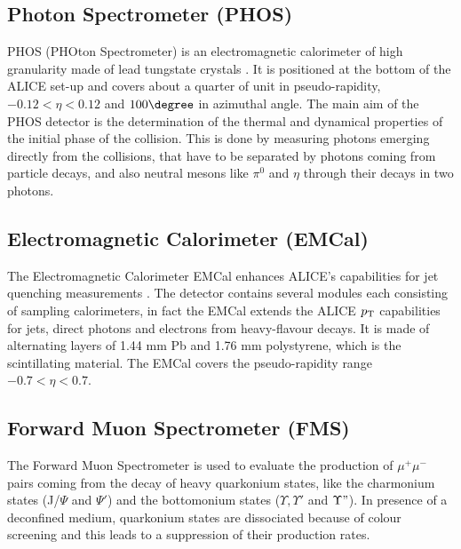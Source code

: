 \subsection{Photon Spectrometer (PHOS)}
PHOS (PHOton Spectrometer) is an electromagnetic calorimeter of high granularity 
made of lead tungstate crystals \cite{PHOS-TDR}. It is positioned at the bottom of the 
ALICE set-up and covers about a quarter of unit in pseudo-rapidity, $-0.12<\eta<0.12$ and $100\degree$ 
in azimuthal angle. The main aim of the PHOS detector is the determination of the 
thermal and dynamical properties of the initial phase of the collision. This is done 
by measuring photons emerging directly from the collisions, that have to be 
separated by photons coming from particle decays, and also neutral mesons like 
$\pi^0$ and $\eta$ through their decays in two photons.

\subsection{Electromagnetic Calorimeter (EMCal)}
The Electromagnetic Calorimeter EMCal enhances ALICE's capabilities for jet 
quenching measurements \cite{EMCal-TDR}.
The detector contains several modules each consisting of sampling calorimeters,
 in fact the EMCal extends the ALICE $p_{\rm T}$ capabilities for jets, direct photons and 
 electrons from heavy-flavour decays. It is made of alternating layers of 1.44 mm Pb 
 and 1.76 mm polystyrene, which is the scintillating material. The EMCal covers the
  pseudo-rapidity range $-0.7 < \eta < 0.7$.

\subsection{Forward Muon Spectrometer (FMS)}
The Forward Muon Spectrometer is used to evaluate the production of $\mu^+\mu^-$
 pairs coming from the decay of heavy quarkonium states, like the charmonium states 
 (J/$\Psi$ and $\Psi'$) and the bottomonium states ($\Upsilon, \Upsilon'$ and $ \Upsilon"$).
  In presence of a deconfined medium, quarkonium states are dissociated because 
  of colour screening and this leads to a suppression of their production rates.

